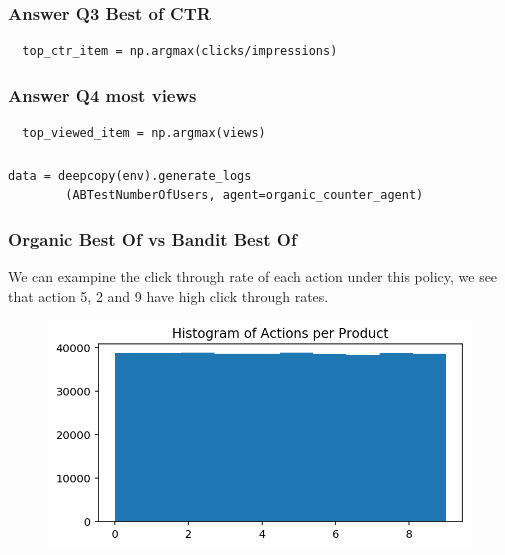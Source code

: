 \begin{frame}[fragile]
  \frametitle{Answer Q3 Best of CTR}
\begin{verbatim}
  top_ctr_item = np.argmax(clicks/impressions)
\end{verbatim}
\end{frame}


\begin{frame}[fragile]
  \frametitle{Answer Q4 most views}
\begin{verbatim}
  top_viewed_item = np.argmax(views)
\end{verbatim}
\end{frame}




\begin{frame}[fragile]
  \frametitle{}
  \begin{small}
\begin{verbatim}
data = deepcopy(env).generate_logs
        (ABTestNumberOfUsers, agent=organic_counter_agent)
\end{verbatim}
\end{small}
\end{frame}




\begin{frame}
\frametitle{Organic Best Of vs Bandit Best Of}

We can exampine the click through rate of each action under this policy, we see that action 5, 2 and 9 have high click through rates.

\begin{figure}[h!]
\includegraphics[scale=0.4]{images/organic_bestof0.png}
\centering
\label{motex1}
\end{figure}
\end{frame}


